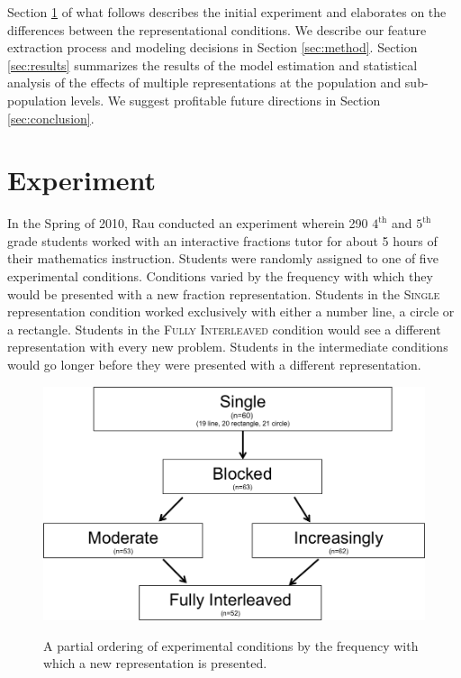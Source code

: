 \documentclass{edm_template}
\newcommand{\mgr}[1]{\textsc{#1}}
\begin{document}
Section \ref{sec:experiment} of what follows describes the initial experiment and elaborates on the differences between the representational conditions. We describe our feature extraction process and modeling decisions in Section \ref{sec:method}. Section \ref{sec:results} summarizes the results of the model estimation and statistical analysis of the effects of multiple representations at the population and sub-population levels. We  suggest profitable future directions in Section \ref{sec:conclusion}.

\section{Experiment}
\label{sec:experiment}

In the Spring of 2010, Rau conducted an experiment wherein 290 $4^\text{th}$ and $5^\text{th}$ grade students worked with an interactive fractions tutor for about 5 hours of their mathematics instruction. Students were randomly assigned to one of five experimental conditions. Conditions varied by the frequency with which they would be presented with a new fraction representation. Students in the \mgr{Single} representation condition worked exclusively with either a number line, a circle or a rectangle. Students in the \mgr{Fully Interleaved} condition would see a different representation with every new problem. Students in the intermediate conditions would go longer before they were presented with a different representation.   
\begin{figure}[htbp]
\centering
\includegraphics[scale=.4]{conditionGraph.png}\\
\caption{A partial ordering of experimental conditions by the frequency with which a new representation is presented. }
\label{fig:condition-graph}
\end{figure}
\end{document}
